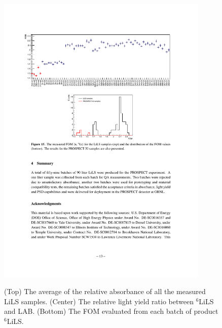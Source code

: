 \begin{figure}[h!]
    \includegraphics[width=0.9\textwidth]{Figures/LSQA3.pdf}\\
    \caption[The QA measurements of the $^6$LiLS]{(Top) The average of the relative absorbance of all the measured LiLS samples.
    (Center) The relative light yield ratio between $^6$LiLS and LAB.
    (Bottom) The FOM evaluated from each batch of product $^6$LiLS. \cite{bib:lspaper}}
    \label{fig:LSQA}
\end{figure}

\label{sec:OG}

